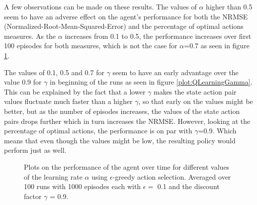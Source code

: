 \documentclass{article}
\begin{document}
A few observations can be made on these results. The values of $\alpha$ higher than 0.5 seem to have an adverse effect on the agent's performance for both the NRMSE (Normalized-Root-Mean-Squared-Error) and the percentage of optimal actions measures. As the $\alpha$ increases from 0.1 to 0.5, the performance increases over first 100 episodes for both measures, which is not the case for $\alpha$=0.7 as seen in figure \ref{plot:QLearningAlpha}. 

The values of 0.1, 0.5 and 0.7 for $\gamma$ seem to have an early advantage over the value 0.9 for $\gamma$ in beginning of the runs as seen in figure \ref{plot:QLearningGamma}. This can be explained by the fact that a lower $\gamma$ makes the state action pair values fluctuate much faster than a higher $\gamma$, so that early on the values might be better, but as the number of episodes increases, the values of the state action pairs drops further which in turn increases the NRMSE. However, looking at the percentage of optimal actions, the performance is on par with $\gamma$=0.9. Which means that even though the values might be low, the resulting policy would perform just as well.

\begin{figure}[ht]
\centering
{}
\caption{Plots on the performance of the agent over time for different values of the learning rate $\alpha$ using $\epsilon$-greedy action selection. Averaged over 100 runs with 1000 episodes each with $\epsilon = $ 0.1 and the discount factor $\gamma$ = 0.9.}
\label{plot:QLearningAlpha}
\end{figure}
\end{document}
